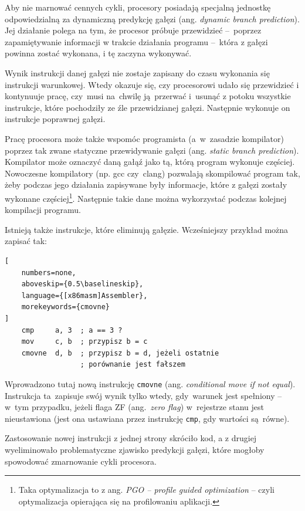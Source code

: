 Aby nie marnować cennych cykli, procesory posiadają specjalną jednostkę odpowiedzialną za dynamiczną predykcję gałęzi (ang. \textit{dynamic branch prediction}). Jej działanie polega na tym, że procesor próbuje przewidzieć --~poprzez zapamiętywanie informacji w trakcie działania programu --~która z gałęzi powinna zostać wykonana, i tę zaczyna wykonywać.

Wynik instrukcji danej gałęzi nie zostaje zapisany do czasu wykonania się instrukcji warunkowej. Wtedy okazuje się, czy procesorowi udało się przewidzieć i kontynuuje pracę, czy~musi na~chwilę ją~przerwać i~usunąć z potoku wszystkie instrukcje, które pochodziły ze źle przewidzianej gałęzi. Następnie wykonuje on instrukcje poprawnej gałęzi.

Pracę procesora może także wspomóc programista (a~w~zasadzie kompilator) poprzez tak zwane statyczne przewidywanie gałęzi (ang. \textit{static branch prediction}). Kompilator może oznaczyć daną gałąź jako tą, którą program wykonuje częściej. Nowoczesne kompilatory (np. gcc czy~clang) pozwalają skompilować program tak, żeby podczas jego działania zapisywane były informacje, które z gałęzi zostały wykonane częściej\footnote{Taka optymalizacja to z ang. \textit{PGO -- profile guided optimization} -- czyli optymalizacja opierająca się na profilowaniu aplikacji.}. Następnie takie dane można wykorzystać podczas kolejnej kompilacji programu.


Istnieją także instrukcje, które eliminują gałęzie. Wcześniejszy przykład można zapisać tak:

\begin{lstlisting}[
    numbers=none,
    aboveskip={0.5\baselineskip},
    language={[x86masm]Assembler},
    morekeywords={cmovne}
]
	cmp 	a, 3  ; a == 3 ?
	mov 	c, b  ; przypisz b = c
	cmovne 	d, b  ; przypisz b = d, jeżeli ostatnie
	    	      ; porównanie jest fałszem
\end{lstlisting}

Wprowadzono tutaj nową instrukcję \texttt{cmovne} (ang. \textit{conditional move if not equal}). Instrukcja ta~zapisuje swój wynik tylko wtedy, gdy~warunek jest spełniony -- w~tym przypadku, jeżeli flaga ZF (ang.~\textit{zero flag}) w~rejestrze stanu jest nieustawiona (jest ona ustawiana przez instrukcję \texttt{cmp}, gdy wartości są~równe).

Zastosowanie nowej instrukcji z jednej strony skróciło kod, a z drugiej wyeliminowało problematyczne zjawisko predykcji gałęzi, które mogłoby spowodować zmarnowanie cykli procesora.

